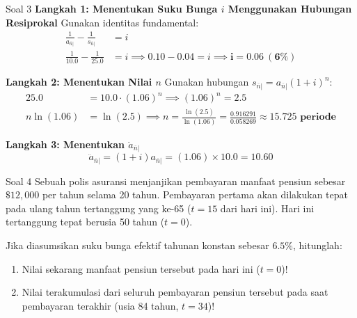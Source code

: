 \documentclass[11pt,a4paper]{article}
\begin{document}
\begin{solutionbox}{Soal 3}
\textbf{Langkah 1: Menentukan Suku Bunga $i$ Menggunakan Hubungan Resiprokal}
Gunakan identitas fundamental:
\begin{align*}
    \frac{1}{a_{\overline{n}|}} - \frac{1}{s_{\overline{n}|}} &= i \\[0.4em]
    \frac{1}{10.0} - \frac{1}{25.0} &= i \implies 0.10 - 0.04 = i \implies \mathbf{i = 0.06 \ (6\%)}
\end{align*}

\textbf{Langkah 2: Menentukan Nilai $n$}
Gunakan hubungan $s_{\overline{n}|} = a_{\overline{n}|}(1+i)^n$:
\begin{align*}
    25.0 &= 10.0 \cdot (1.06)^n \implies (1.06)^n = 2.5 \\[0.4em]
    n \ln(1.06) &= \ln(2.5) \implies n = \frac{\ln(2.5)}{\ln(1.06)} = \frac{0.916291}{0.058269} \approx \mathbf{15.725 \text{ periode}}
\end{align*}

\textbf{Langkah 3: Menentukan $\ddot{a}_{\overline{n}|}$}
\begin{equation*}
    \ddot{a}_{\overline{n}|} = (1+i) a_{\overline{n}|} = (1.06) \times 10.0 = \mathbf{10.60}
\end{equation*}
\end{solutionbox}

\vspace{1.5em}

\begin{problembox}{Soal 4}
Sebuah polis asuransi menjanjikan pembayaran manfaat pensiun sebesar $\$12{,}000$ per tahun selama 20 tahun. Pembayaran pertama akan dilakukan tepat pada ulang tahun tertanggung yang ke-65 ($t = 15$ dari hari ini). Hari ini tertanggung tepat berusia 50 tahun ($t = 0$).

Jika diasumsikan suku bunga efektif tahunan konstan sebesar $6.5\%$, hitunglah:
\begin{enumerate}[label=(\alph*)]
    \item Nilai sekarang manfaat pensiun tersebut pada hari ini ($t = 0$)!
    \item Nilai terakumulasi dari seluruh pembayaran pensiun tersebut pada saat pembayaran terakhir (usia 84 tahun, $t = 34$)!
\end{enumerate}
\end{problembox}
\end{document}

